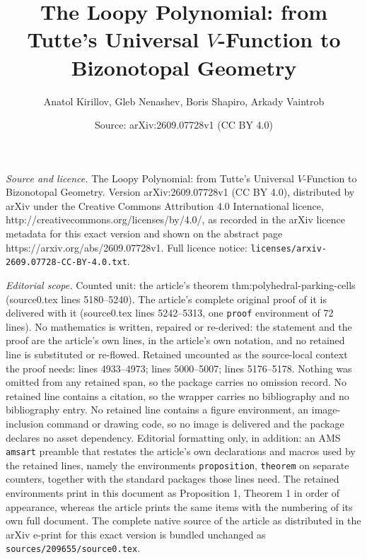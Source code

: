 \documentclass[10pt,a4paper]{amsart}
\title{The Loopy Polynomial: from Tutte's Universal $V$-Function to Bizonotopal Geometry}
\author{Anatol Kirillov, Gleb Nenashev, Boris Shapiro, Arkady Vaintrob}
\date{Source: arXiv:2609.07728v1 (CC BY 4.0)}
\begin{document}
\maketitle

\noindent\emph{Source and licence.} The Loopy Polynomial: from Tutte's Universal $V$-Function to Bizonotopal Geometry. Version arXiv:2609.07728v1 (CC BY 4.0), distributed by arXiv under the Creative Commons Attribution 4.0 International licence, http://creativecommons.org/licenses/by/4.0/, as recorded in the arXiv licence metadata for this exact version and shown on the abstract page https://arxiv.org/abs/2609.07728v1. Full licence notice: \texttt{licenses/arxiv-2609.07728-CC-BY-4.0.txt}.\par\smallskip

\noindent\textit{Editorial scope.} Counted unit: the article's theorem thm:polyhedral-parking-cells (source0.tex lines 5180--5240). The article's complete original proof of it is delivered with it (source0.tex lines 5242--5313, one \texttt{proof} environment of 72 lines). No mathematics is written, repaired or re-derived: the statement and the proof are the article's own lines, in the article's own notation, and no retained line is substituted or re-flowed.  Retained uncounted as the source-local context the proof needs: lines 4933--4973; lines 5000--5007; lines 5176--5178.  Nothing was omitted from any retained span, so the package carries no omission record.  No retained line contains a citation, so the wrapper carries no bibliography and no bibliography entry.  No retained line contains a figure environment, an image-inclusion command or drawing code, so no image is delivered and the package declares no asset dependency.  Editorial formatting only, in addition: an AMS \texttt{amsart} preamble that restates the article's own declarations and macros used by the retained lines, namely the environments \texttt{proposition}, \texttt{theorem} on separate counters, together with the standard packages those lines need.  The retained environments print in this document as Proposition 1, Theorem 1 in order of appearance, whereas the article prints the same items with the numbering of its own full document.  The complete native source of the article as distributed in the arXiv e-print for this exact version is bundled unchanged as \texttt{sources/209655/source0.tex}.
\end{document}
